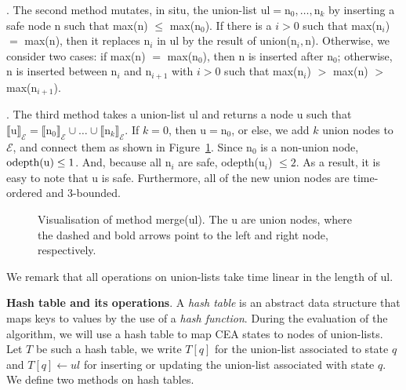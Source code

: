 . The second method mutates, in situ, the union-list $\textrm{ul} = \textrm{n}_{0}, \ldots, \textrm{n}_{k}$ by inserting a safe node \textrm{n} such that max($\textrm{n}$) $\le$ max($\textrm{n}_{0}$). If there is a $i > 0$ such that max($\textrm{n}_{i}$) $=$ max($\textrm{n}$), then it replaces $\textrm{n}_{i}$ in \textrm{ul} by the result of union($\textrm{n}_{i}, \textrm{n}$). Otherwise, we consider two cases: if max($\textrm{n}$) $=$ max($\textrm{n}_{0}$), then \textrm{n} is inserted after $\textrm{n}_{0}$; otherwise,  \textrm{n} is inserted between $\textrm{n}_{i}$ and $\textrm{n}_{i+1}$ with $i > 0$ such that max($\textrm{n}_{i}$) $>$ max($\textrm{n}$) $>$ max($\textrm{n}_{i+1}$).

. The third method takes a union-list \textrm{ul} and returns a node \textrm{u} such that ${\llbracket \textrm{u} \rrbracket}_{\mathcal{E}} = {\llbracket \textrm{n}_{0} \rrbracket}_{\mathcal{E}} \cup \ldots \cup {\llbracket \textrm{n}_{k} \rrbracket}_{\mathcal{E}} $. If $k = 0$, then $\textrm{u} = \textrm{n}_{0}$, or else, we add $k$ union nodes to $\mathcal{E}$, and connect them as shown in Figure~\ref{fig:merge}. Since $\textrm{n}_{0}$ is a non-union node, $\text{odepth(\textrm{u})} \le 1$. And, because all $\textrm{n}_{i}$ are safe, odepth($\textrm{u}_i$) $\le 2$. As a result, it is easy to note that \textrm{u} is safe. Furthermore, all of the new union nodes are time-ordered and $3$-bounded.

\begin{figure}[t]
  \centering
  \caption{Visualisation of method merge(\textrm{ul}). The \textrm{u} are union nodes, where the dashed and bold arrows point to the left and right node, respectively.}
  \label{fig:merge}
\end{figure}

We remark that all operations on union-lists take time linear in the length of \textrm{ul}.

\textbf{Hash table and its operations}. A \emph{hash table} is an abstract data structure that maps keys to values by the use of a \emph{hash function}. During the evaluation of the algorithm, we will use a hash table to map CEA states to nodes of union-lists. Let $T$ be such a hash table, we write $T[q]$ for the union-list associated to state $q$ and $T[q] \leftarrow ul$ for inserting or updating the union-list associated with state $q$. We define two methods on hash tables.

